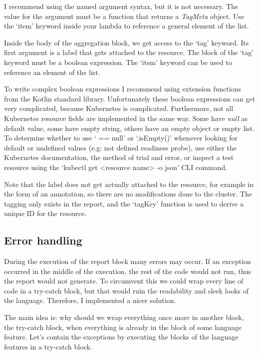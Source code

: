 I recommend using the named argument syntax, but it is not necessary. The value for the argument must be a function that returns a \emph{TagMeta} object. Use the `item' keyword inside your lambda to reference a general element of the list.

Inside the body of the aggregation block, we get access to the `tag' keyword. Its first argument is a label that gets attached to the resource. The block of the `tag' keyword must be a boolean expression. The `item' keyword can be used to reference an element of the list.

To write complex boolean expressions I recommend using extension functions from the Kotlin standard library. Unfortunately these boolean expressions can get very complicated, because Kubernetes is complicated. Furthermore, not all Kubernetes resource fields are implemented in the same way. Some have \emph{null} as default value, some have empty string, others have an empty object or empty list. To determine whether to use ` == null' or `.isEmpty()' whenever looking for default or undefined values (e.g: not defined readiness probe), use either the Kubernetes documentation, the method of trial and error, or inspect a test resource using the `kubectl get <resource name> -o json' CLI command.

Note that the label does not get actually attached to the resource, for example in the form of an annotation, so there are no modifications done to the cluster. The tagging only exists in the report, and the `tagKey' function is used to derive a unique ID for the resource.

\subsection{Error handling}

During the execution of the report block many errors may occur. If an exception occurred in the middle of the execution, the rest of the code would not run, thus the report would not generate. To circumvent this we could wrap every line of code in a try-catch block, but that would ruin the readability and sleek looks of the language. Therefore, I implemented a nicer solution.

The main idea is: why should we wrap everything once more in another block, the try-catch block, when everything is already in the block of some language feature. Let's contain the exceptions by executing the blocks of the language features in a try-catch block.

